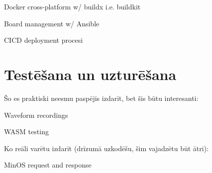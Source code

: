 Docker cross-platform w/ buildx i.e. buildkit

Board management w/ Ansible

CICD deployment procesi

\section{Testēšana un uzturēšana}
\label{sec:usage}

Šo es praktiski neesmu paspējis izdarīt, bet šis būtu interesanti:

Waveform recordings

WASM testing

Ko reāli varētu izdarīt (drīzumā uzkodēšu, šim vajadzētu būt ātri):

MinOS request and response
